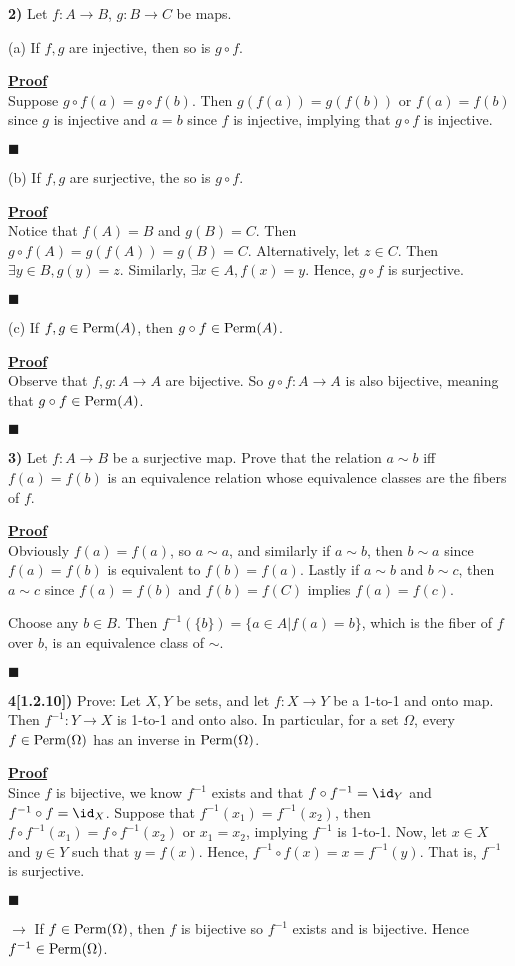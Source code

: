 \documentclass[12pt,a4paper]{article}
\newcommand{\prob}[2]{\textbf{#1)} #2}
\newenvironment{proof}
{
\textbf{\underline{Proof}} \\
}
{
\begin{flushright}
$\blacksquare$
\end{flushright}}
\begin{document}
\prob{2}{Let $f: A \rightarrow B$, $g: B \rightarrow C$ be maps.}

(a) If $f,g$ are injective, then so is $g \circ f$.

\begin{proof}
Suppose $g \circ f(a) = g \circ f(b)$. Then $g(f(a)) = g(f(b))$ or $f(a) = f(b)$ since $g$ is injective and $a = b$ since $f$ is injective, implying that $g \circ f$ is injective.
\end{proof}

(b) If $f,g$ are surjective, the so is $g \circ f$.

\begin{proof}
Notice that $f(A) = B$ and $g(B) = C$. Then $g \circ f(A) = g(f(A)) = g(B) = C$. Alternatively, let $z \in C$. Then $\exists y \in B, g(y) = z$. Similarly, $\exists x \in A, f(x) = y$. Hence, $g \circ f$ is surjective.
\end{proof}

(c) If $f,g \in {\rm Perm}(A)$, then $g \circ f \in {\rm Perm}(A)$.

\begin{proof}
Observe that $f,g: A \rightarrow A$ are bijective. So $g \circ f: A \rightarrow A$ is also bijective, meaning that $g \circ f \in {\rm Perm}(A)$.
\end{proof} 

\prob{3}{Let $f: A \rightarrow B$ be a surjective map. Prove that the relation $a \sim b$ iff $f(a) = f(b)$ is an equivalence relation whose equivalence classes are the fibers of $f$.}

\begin{proof}
Obviously $f(a) = f(a)$, so $a \sim a$, and similarly if $a \sim b$, then $b \sim a$ since $f(a) = f(b)$ is equivalent to $f(b) = f(a)$. Lastly if $a \sim b$ and $b \sim c$, then $a \sim c$ since $f(a) = f(b)$ and $f(b) = f(C)$ implies $f(a) = f(c)$.

Choose any $b \in B$. Then $f^{-1}(\{b\}) = \{a \in A | f(a) = b\}$, which is the fiber of $f$ over $b$, is an equivalence class of $\sim$.
\end{proof}

\prob{4[1.2.10]}{Prove: Let $X,Y$ be sets, and let $f: X \rightarrow Y$ be a 1-to-1 and onto map. Then $f^{-1}: Y \rightarrow X$ is 1-to-1 and onto also. In particular, for a set $\Omega$, every $f \in {\rm Perm}(\Omega)$ has an inverse in ${\rm Perm}(\Omega)$.}

\begin{proof}
Since $f$ is bijective, we know $f^{-1}$ exists and that $f \circ f^{-1} = \id_{Y}$ and $f^{-1} \circ f = \id_{X}$. Suppose that $f^{-1}(x_1) = f^{-1}(x_2)$, then $f \circ f^{-1}(x_1) = f \circ f^{-1}(x_2)$ or $x_1 = x_2$, implying $f^{-1}$ is 1-to-1. Now, let $x \in X$ and $y \in Y$ such that $y = f(x)$. Hence, $f^{-1} \circ f(x) = x = f^{-1}(y)$. That is, $f^{-1}$ is surjective.
\end{proof}
$\rightarrow$ If $f \in {\rm Perm}(\Omega)$, then $f$ is bijective so $f^{-1}$ exists and is bijective. Hence $f^{-1} \in {\rm Perm}(\Omega)$.
\end{document}

